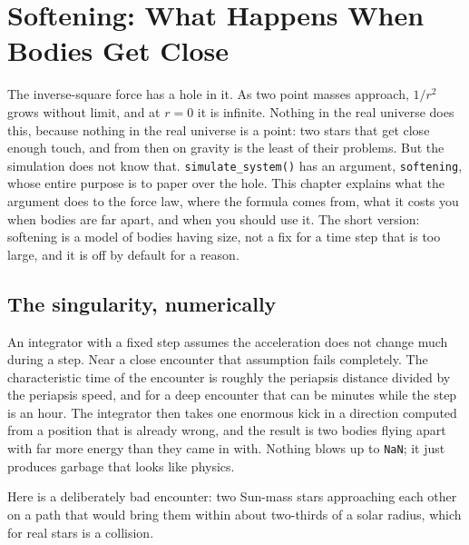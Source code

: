 \documentclass[
  10.5pt,
  letterpaper,
]{scrbook}
\theoremstyle{plain}
\theoremstyle{remark}
\begin{document}
\chapter{Softening: What Happens When Bodies Get
Close}\label{sec-softening}

The inverse-square force has a hole in it. As two point masses approach,
\(1/r^2\) grows without limit, and at \(r = 0\) it is infinite. Nothing
in the real universe does this, because nothing in the real universe is
a point: two stars that get close enough touch, and from then on gravity
is the least of their problems. But the simulation does not know that.
\texttt{simulate\_system()} has an argument, \texttt{softening}, whose
entire purpose is to paper over the hole. This chapter explains what the
argument does to the force law, where the formula comes from, what it
costs you when bodies are far apart, and when you should use it. The
short version: softening is a model of bodies having size, not a fix for
a time step that is too large, and it is off by default for a reason.

\section{The singularity,
numerically}\label{the-singularity-numerically}

An integrator with a fixed step assumes the acceleration does not change
much during a step. Near a close encounter that assumption fails
completely. The characteristic time of the encounter is roughly the
periapsis distance divided by the periapsis speed, and for a deep
encounter that can be minutes while the step is an hour. The integrator
then takes one enormous kick in a direction computed from a position
that is already wrong, and the result is two bodies flying apart with
far more energy than they came in with. Nothing blows up to
\texttt{NaN}; it just produces garbage that looks like physics.

Here is a deliberately bad encounter: two Sun-mass stars approaching
each other on a path that would bring them within about two-thirds of a
solar radius, which for real stars is a collision.
\end{document}
